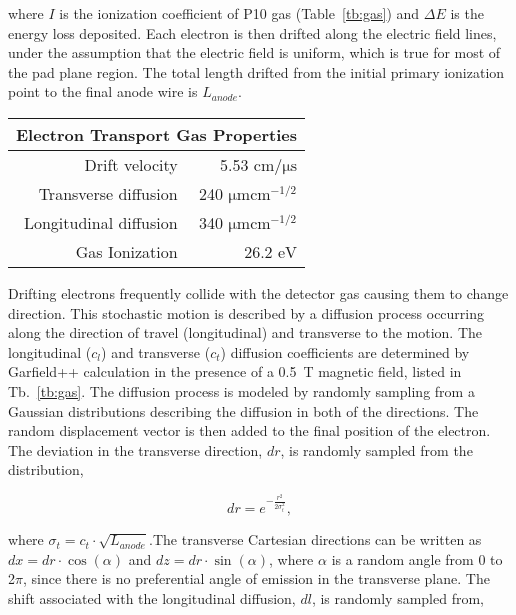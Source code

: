 where $I$ is the ionization coefficient of P10 gas (Table~\ref{tb:gas}) and $\Delta E$ is the energy loss deposited. Each electron is then drifted along the electric field lines, under the assumption  that the electric field is uniform, which is true for most of the pad plane region. The total length drifted from the initial primary ionization point to the final anode wire is $L_{anode}$. 

\begin{table*}\centering
{}
\begin{tabular}{@{}rr@{}}\toprule 
\multicolumn{2}{c}{Electron Transport Gas Properties} \\
 \midrule
Drift velocity & 5.53 $\si{\centi\meter\per\micro\second}$\\
Transverse diffusion & 240 $\si{\micro \meter \centi\meter}^{-1/2}$\\
Longitudinal diffusion &  340 $\si{\micro \meter \centi\meter}^{-1/2}$\\
Gas Ionization & 26.2 $\si{\eV}$\\
\bottomrule
\end{tabular}
\caption{An overview of electron drift properties in P10 gas.}
\label{tb:gas}
\end{table*}

Drifting electrons frequently collide with the detector gas causing them to change direction. This stochastic motion is  described by a diffusion process occurring along the direction of travel (longitudinal) and transverse to the motion. The longitudinal ($c_{l}$) and transverse ($c_{t}$) diffusion coefficients are determined by Garfield++ calculation  \cite{garfield++} in the presence of a \SI{0.5}{\tesla} magnetic field, listed in Tb.~\ref{tb:gas}. The diffusion process is modeled by randomly sampling from a Gaussian distributions describing the diffusion in both of the directions. The random displacement vector is then added to the final position of the electron. The deviation in the transverse direction, $dr$, is randomly sampled from the distribution,

\begin{equation}
dr = e^{-\frac{r^2}{2\sigma_{t}^2}},
\end{equation}

where $\sigma_{t}=c_{t}\cdot\sqrt{L_{anode}}$.The transverse Cartesian directions can be written as $dx = dr \cdot \cos(\alpha)$ and $dz = dr \cdot \sin(\alpha)$, where $\alpha$ is a random angle from 0 to 2$\pi$, since there is no preferential angle  of emission in the transverse plane. The shift associated with the longitudinal diffusion, $dl$, is randomly sampled from, 

